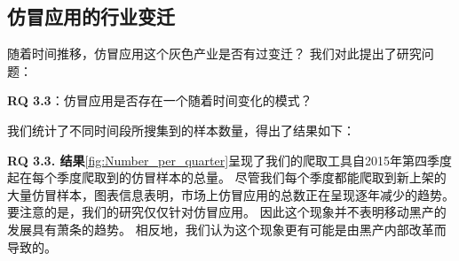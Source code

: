 \subsection{仿冒应用的行业变迁}
随着时间推移，仿冒应用这个灰色产业是否有过变迁？
我们对此提出了研究问题：

{\bf RQ 3.3}：仿冒应用是否存在一个随着时间变化的模式？

我们统计了不同时间段所搜集到的样本数量，得出了结果如下：

{\bf RQ 3.3. 结果}\autoref{fig:Number_per_quarter}呈现了我们的爬取工具自2015年第四季度起在每个季度爬取到的仿冒样本的总量。
尽管我们每个季度都能爬取到新上架的大量仿冒样本，图表信息表明，市场上仿冒应用的总数正在呈现逐年减少的趋势。
要注意的是，我们的研究仅仅针对仿冒应用。
因此这个现象并不表明移动黑产的发展具有萧条的趋势。
相反地，我们认为这个现象更有可能是由黑产内部改革而导致的。

